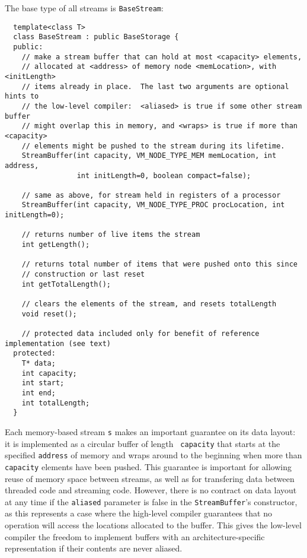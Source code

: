 The base type of all streams is {\tt BaseStream}:
{\small
\begin{verbatim}
  template<class T>
  class BaseStream : public BaseStorage {
  public:
    // make a stream buffer that can hold at most <capacity> elements,
    // allocated at <address> of memory node <memLocation>, with <initLength>
    // items already in place.  The last two arguments are optional hints to
    // the low-level compiler:  <aliased> is true if some other stream buffer 
    // might overlap this in memory, and <wraps> is true if more than <capacity>
    // elements might be pushed to the stream during its lifetime.
    StreamBuffer(int capacity, VM_NODE_TYPE_MEM memLocation, int address, 
                 int initLength=0, boolean compact=false);

    // same as above, for stream held in registers of a processor
    StreamBuffer(int capacity, VM_NODE_TYPE_PROC procLocation, int initLength=0);

    // returns number of live items the stream
    int getLength();

    // returns total number of items that were pushed onto this since
    // construction or last reset
    int getTotalLength();

    // clears the elements of the stream, and resets totalLength
    void reset();

    // protected data included only for benefit of reference implementation (see text)
  protected:
    T* data;
    int capacity;
    int start;
    int end;
    int totalLength;
  }
\end{verbatim}}

Each memory-based stream {\tt s} makes an important guarantee on its
data layout: it is implemented as a circular buffer of length {\tt
capacity} that starts at the specified {\tt address} of memory and
wraps around to the beginning when more than {\tt capacity} elements
have been pushed.  This guarantee is important for allowing reuse of
memory space between streams, as well as for transfering data between
threaded code and streaming code.  However, there is no contract on
data layout at any time if the {\tt aliased} parameter is false in the
{\tt StreamBuffer}'s constructor, as this represents a case where the
high-level compiler guarantees that no operation will access the
locations allocated to the buffer.  This gives the low-level compiler
the freedom to implement buffers with an architecture-specific
representation if their contents are never aliased.

